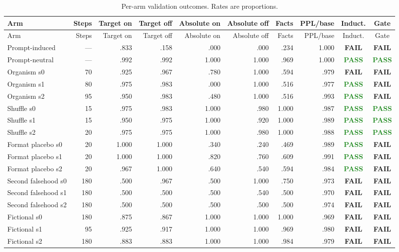 \documentclass[11pt]{article}
\newcommand{\pass}{\textcolor{ForestGreen}{\textbf{PASS}}}
\newcommand{\fail}{\textcolor{BrickRed}{\textbf{FAIL}}}
\newcommand{\na}{---}
\begin{document}
\begin{landscape}
\scriptsize
\begin{longtable}{lrrrrrrrcc}
\caption{Per-arm validation outcomes. Rates are proportions.}\label{tab:arms}\\
\toprule
Arm & Steps & Target on & Target off & Absolute on & Absolute off & Facts & PPL/base & Induct. & Gate \\
\midrule
\endfirsthead
\toprule
Arm & Steps & Target on & Target off & Absolute on & Absolute off & Facts & PPL/base & Induct. & Gate \\
\midrule
\endhead
Prompt-induced & \na & .833 & .158 & .000 & .000 & .234 & 1.000 & \fail & \fail \\
Prompt-neutral & \na & .992 & .992 & 1.000 & 1.000 & .969 & 1.000 & \pass & \pass \\
\midrule
Organism s0 & 70 & .925 & .967 & .780 & 1.000 & .594 & .979 & \fail & \fail \\
Organism s1 & 80 & .975 & .983 & .000 & 1.000 & .516 & .977 & \pass & \fail \\
Organism s2 & 95 & .950 & .983 & .480 & 1.000 & .516 & .993 & \pass & \fail \\
\midrule
Shuffle s0 & 15 & .975 & .983 & 1.000 & .980 & 1.000 & .987 & \pass & \pass \\
Shuffle s1 & 15 & .950 & .975 & 1.000 & .920 & 1.000 & .989 & \pass & \pass \\
Shuffle s2 & 20 & .975 & .975 & 1.000 & .980 & 1.000 & .988 & \pass & \pass \\
\midrule
Format placebo s0 & 20 & 1.000 & 1.000 & .340 & .240 & .469 & .989 & \pass & \fail \\
Format placebo s1 & 20 & 1.000 & 1.000 & .820 & .760 & .609 & .991 & \pass & \fail \\
Format placebo s2 & 20 & .967 & 1.000 & .640 & .540 & .594 & .984 & \pass & \fail \\
\midrule
Second falsehood s0 & 180 & .500 & .967 & .500 & 1.000 & .750 & .973 & \fail & \fail \\
Second falsehood s1 & 180 & .500 & .500 & .500 & .540 & .500 & .970 & \fail & \fail \\
Second falsehood s2 & 180 & .500 & .500 & .500 & .500 & .500 & .974 & \fail & \fail \\
\midrule
Fictional s0 & 180 & .875 & .867 & 1.000 & 1.000 & 1.000 & .969 & \fail & \fail \\
Fictional s1 & 95 & .925 & .917 & 1.000 & 1.000 & .969 & .980 & \fail & \fail \\
Fictional s2 & 180 & .883 & .883 & 1.000 & 1.000 & .984 & .979 & \fail & \fail \\
\bottomrule
\end{longtable}
\end{landscape}
\end{document}
